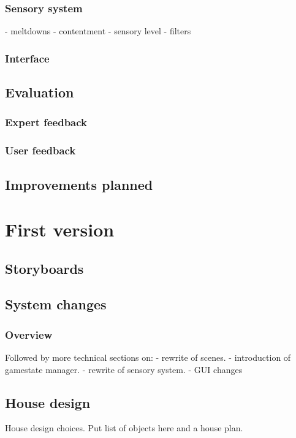 \documentclass[11pt]{report}
\begin{document}
\subsection{Sensory system}
- meltdowns
- contentment
- sensory level
- filters

\subsection{Interface}
\section{Evaluation}
\subsection{Expert feedback}
\subsection{User feedback}
\section{Improvements planned}

\chapter{First version}

\section{Storyboards}

\section{System changes}

\subsection{Overview}

Followed by more technical sections on:
- rewrite of scenes.
- introduction of gamestate manager.
- rewrite of sensory system.
- GUI changes

\section{House design}
House design choices. 
Put list of objects here and a house plan. 
\end{document}
